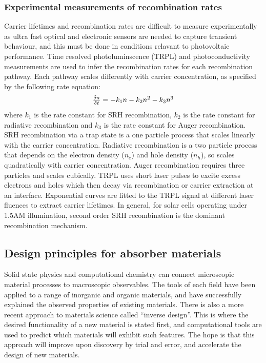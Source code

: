 \subsubsection{Experimental measurements of recombination rates} 

Carrier lifetimes and recombination rates are difficult to measure experimentally as ultra fast optical and electronic sensors are needed to capture transient behaviour, and this must be done in conditions relavant to photovoltaic performance. Time resolved photoluminscence (TRPL) and photoconductivity measurements are used to infer the recombination rates for each recombination pathway.
Each pathway scales differently with carrier concentration, as specified by the following rate equation:
\begin{equation}
$$ \frac{\delta n}{\delta t} = -k_1n -k_2n^2 -k_3n^3 $$
\end{equation}
where $k_1$ is the rate constant for SRH recombination, $k_2$ is the rate constant for radiative recombination and $k_3$ is the rate constant for Auger recombination. SRH recombination via a trap state is a one particle process that scales linearly with the carrier concentration. Radiative recombination is a two particle process that depends on the electron density ($n_e$) and hole density ($n_h$), so scales quadratically with carrier concentration. Auger recombination requires three particles and scales cubically.
TRPL uses short laser pulses to excite excess electrons and holes which then decay via recombination or carrier extraction at an interface. Exponential curves are fitted to the TRPL signal at different laser fluences to extract carrier lifetimes. In general, for solar cells operating under 1.5AM illumination, second order SRH recombination is the dominant recombination mechanism.
% 


 \subsection{Design principles for absorber materials}
 
Solid state physics and computational chemistry can connect microscopic material processes to macroscopic observables. The tools of each field have been applied to a range of inorganic and organic materials, and have successfully explained the observed properties of existing materials.
There is also a more recent approach to materials science called ``inverse design''. This is where the desired functionality of a new material is stated first, and computational tools are used to predict which materials will exhibit such features.\autocite{Zunger2018}
The hope is that this approach will improve upon discovery by trial and error, and accelerate the design of new materials.

